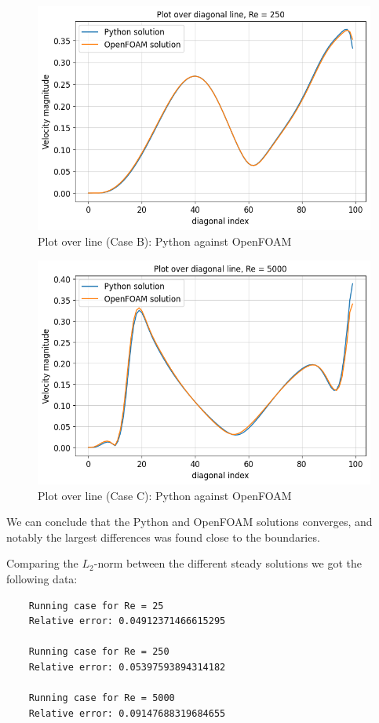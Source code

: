 \documentclass[10pt]{report}
\begin{document}
\begin{figure}[H]
    \centering
    \includegraphics[width = \textwidth]{plots/overline_RE250.png}
    \caption{Plot over line (Case B): Python against OpenFOAM}
\end{figure}
\begin{figure}[H]
    \centering
    \includegraphics[width = \textwidth]{plots/overline_RE5000.png}
    \caption{Plot over line (Case C): Python against OpenFOAM}
\end{figure}
We can conclude that the Python and OpenFOAM solutions converges, and notably the largest differences was found close to
the boundaries.

Comparing the $L_2$-norm between the different steady solutions we got the following data:
\begin{lstlisting}
    Running case for Re = 25
    Relative error: 0.04912371466615295

    Running case for Re = 250
    Relative error: 0.05397593894314182

    Running case for Re = 5000
    Relative error: 0.09147688319684655
\end{lstlisting}
\end{document}
